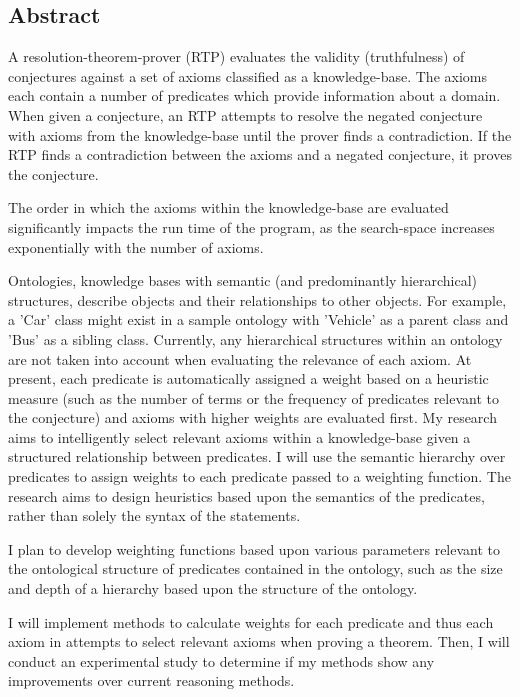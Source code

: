 \documentclass{article}
\begin{document}
\begin{spacing}{2}


\newpage
\section*{Abstract}
A resolution-theorem-prover (RTP) evaluates the validity (truthfulness) of conjectures against a set of axioms classified as a knowledge-base. The axioms each contain a number of predicates which provide information about a domain. When given a conjecture, an RTP attempts to resolve the negated conjecture with axioms from the knowledge-base until the prover finds a contradiction. If the RTP finds a contradiction between the axioms and a negated conjecture, it proves the conjecture. 

The order in which the axioms within the knowledge-base are evaluated significantly impacts the run time of the program, as the search-space increases exponentially with the number of axioms. 

Ontologies, knowledge bases with semantic (and predominantly hierarchical) structures, describe objects and their relationships to other objects. For example, a 'Car' class might exist in a sample ontology with 'Vehicle' as a parent class and 'Bus' as a sibling class. Currently, any hierarchical structures within an ontology are not taken into account when evaluating the relevance of each axiom. At present, each predicate is automatically assigned a weight based on a heuristic measure (such as the number of terms or the frequency of predicates relevant to the conjecture) and axioms with higher weights are evaluated first. My research aims to intelligently select relevant axioms within a knowledge-base given a structured relationship between predicates. I will use the semantic hierarchy over predicates to assign weights to each predicate passed to a weighting function. The research aims to design heuristics based upon the semantics of the predicates, rather than solely the syntax of the statements. 

I plan to develop weighting functions based upon various parameters relevant to the ontological structure of predicates contained in the ontology, such as the size and depth of a hierarchy based upon the structure of the ontology. 

I will implement methods to calculate weights for each predicate and thus each axiom in attempts to select relevant axioms when proving a theorem. Then, I will conduct an experimental study to determine if my methods show any improvements over current reasoning methods. 
\newpage

\end{spacing}
\end{document}
